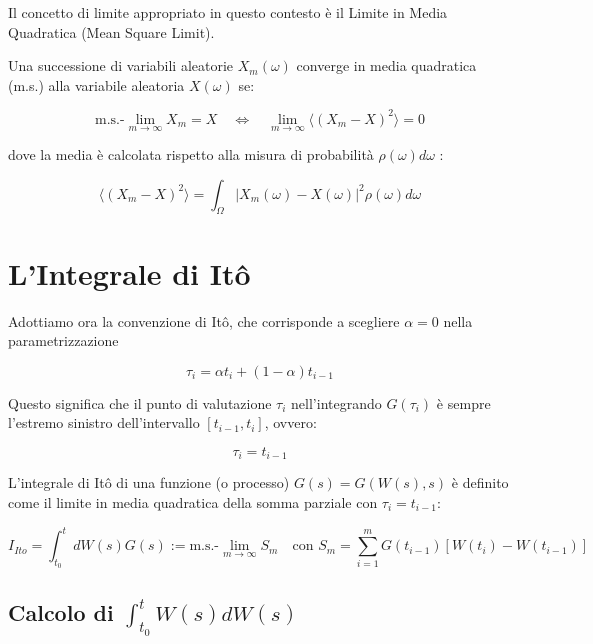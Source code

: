 Il concetto di limite appropriato in questo contesto è il Limite in Media Quadratica (Mean Square Limit).
\begin{tcolorbox}[colback=colorA!5,colframe=colorA, title=Definizione]
Una successione di variabili aleatorie $X_m(\omega)$ converge in media quadratica (m.s.) alla variabile aleatoria $X(\omega)$ se:


\begin{equation} 
\text{m.s.-}\lim_{m\to\infty} X_m = X \quad \iff \quad \lim_{m\to\infty} \langle{ (X_m - X)^2 } \rangle = 0
\end{equation}


dove la media è calcolata rispetto alla misura di probabilità  $\rho(\omega) d\omega$ :


\begin{equation} 
\langle { (X_m - X)^2 } \rangle = \int_{\Omega} |X_m(\omega) - X(\omega)|^2  \rho(\omega) d\omega 
\end{equation}


\end{tcolorbox}

\section{L'Integrale di Itô }
Adottiamo ora la convenzione di Itô, che corrisponde a scegliere $\alpha=0$ nella parametrizzazione 


\begin{equation} \tau_i = \alpha t_i + (1-\alpha) t_{i-1} \end{equation}


Questo significa che il punto di valutazione $\tau_i$ nell'integrando $G(\tau_i)$ è sempre l'estremo sinistro dell'intervallo $[t_{i-1}, t_i]$, ovvero:


 \begin{equation} \tau_i = t_{i-1}  \end{equation}


L'integrale di Itô di una funzione (o processo) $G(s) = G(W(s), s)$ è definito come il limite in media quadratica della somma parziale con $\tau_i = t_{i-1}$:


\begin{equation} 
I_{Ito} = \int_{t_0}^{t} dW(s) G(s) := \text{m.s.-}\lim_{m\to\infty} S_m  \quad \text{con } S_m = \sum_{i=1}^{m} G(t_{i-1}) [W(t_i) - W(t_{i-1})] 
\end{equation}


\subsection{Calcolo di $\int_{t_0}^{t} W(s) dW(s)$ }

